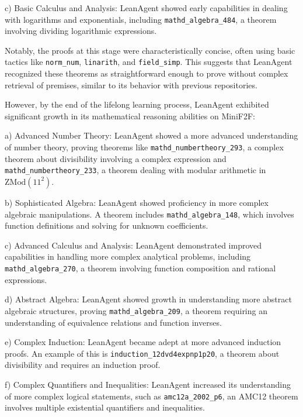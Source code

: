 \documentclass{article} %
\begin{document}
c) Basic Calculus and Analysis:
LeanAgent showed early capabilities in dealing with logarithms and exponentials, including \texttt{mathd\_algebra\_484}, a theorem involving dividing logarithmic expressions.

Notably, the proofs at this stage were characteristically concise, often using basic tactics like \texttt{norm\_num}, \texttt{linarith}, and \texttt{field\_simp}. This suggests that LeanAgent recognized these theorems as straightforward enough to prove without complex retrieval of premises, similar to its behavior with previous repositories.

However, by the end of the lifelong learning process, LeanAgent exhibited significant growth in its mathematical reasoning abilities on MiniF2F:

a) Advanced Number Theory:
LeanAgent showed a more advanced understanding of number theory, proving theorems like \texttt{mathd\_numbertheory\_293}, a complex theorem about divisibility involving a complex expression and \texttt{mathd\_numbertheory\_233}, a theorem dealing with modular arithmetic in $\text{ZMod}(11^2)$.

b) Sophisticated Algebra:
LeanAgent showed proficiency in more complex algebraic manipulations. A theorem includes \texttt{mathd\_algebra\_148}, which involves function definitions and solving for unknown coefficients.

c) Advanced Calculus and Analysis:
LeanAgent demonstrated improved capabilities in handling more complex analytical problems, including \texttt{mathd\_algebra\_270}, a theorem involving function composition and rational expressions.

d) Abstract Algebra:
LeanAgent showed growth in understanding more abstract algebraic structures, proving \texttt{mathd\_algebra\_209}, a theorem requiring an understanding of equivalence relations and function inverses.

e) Complex Induction:
LeanAgent became adept at more advanced induction proofs. An example of this is \texttt{induction\_12dvd4expnp1p20}, a theorem about divisibility and requires an induction proof.

f) Complex Quantifiers and Inequalities:
LeanAgent increased its understanding of more complex logical statements, such as \texttt{amc12a\_2002\_p6}, an AMC12 theorem involves multiple existential quantifiers and inequalities.

\end{document}

